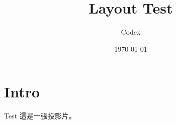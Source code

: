 \documentclass{beamer}
\title{Layout Test}
\author{Codex}
\date{\today}
\begin{document}
\section{Intro}

\begin{frame}{Test}
  這是一張投影片。
\end{frame}

\AgendaFrame
\end{document}
